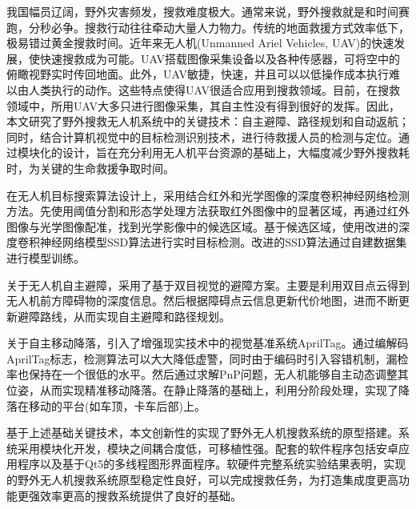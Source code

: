 \CNabstract
{
\thispagestyle{empty}
我国幅员辽阔，野外灾害频发，搜救难度极大。通常来说，野外搜救就是和时间赛跑，分秒必争。搜救行动往往牵动大量人力物力。传统的地面救援方式效率低下，极易错过黄金搜救时间。近年来无人机(Unmanned Ariel Vehicles, UAV)的快速发展，使快速搜救成为可能。UAV搭载图像采集设备以及各种传感器，可将空中的俯瞰视野实时传回地面。此外，UAV敏捷，快速，并且可以以低操作成本执行难以由人类执行的动作。这些特点使得UAV很适合应用到搜救领域。目前，在搜救领域中，所用UAV大多只进行图像采集，其自主性没有得到很好的发挥。因此，本文研究了野外搜救无人机系统中的关键技术：自主避障、路径规划和自动返航；同时，结合计算机视觉中的目标检测识别技术，进行待救援人员的检测与定位。通过模块化的设计，旨在充分利用无人机平台资源的基础上，大幅度减少野外搜救耗时，为关键的生命救援争取时间。

在无人机目标搜索算法设计上，采用结合红外和光学图像的深度卷积神经网络检测方法。先使用阈值分割和形态学处理方法获取红外图像中的显著区域，再通过红外图像与光学图像配准，找到光学影像中的候选区域。基于候选区域，使用改进的深度卷积神经网络模型SSD算法进行实时目标检测。改进的SSD算法通过自建数据集进行模型训练。

关于无人机自主避障，采用了基于双目视觉的避障方案。主要是利用双目点云得到无人机前方障碍物的深度信息。然后根据障碍点云信息更新代价地图，进而不断更新避障路线，从而实现自主避障和路径规划。

关于自主移动降落，引入了增强现实技术中的视觉基准系统AprilTag。通过编解码AprilTag标志，检测算法可以大大降低虚警，同时由于编码时引入容错机制，漏检率也保持在一个很低的水平。然后通过求解PnP问题，无人机能够自主动态调整其位姿，从而实现精准移动降落。在静止降落的基础上，利用分阶段处理，实现了降落在移动的平台(如车顶，卡车后部)上。

基于上述基础关键技术，本文创新性的实现了野外无人机搜救系统的原型搭建。系统采用模块化开发，模块之间耦合度低，可移植性强。配套的软件程序包括安卓应用程序以及基于Qt5的多线程图形界面程序。软硬件完整系统实验结果表明，实现的野外无人机搜救系统原型稳定性良好，可以完成搜救任务，为打造集成度更高功能更强效率更高的搜救系统提供了良好的基础。
\thispagestyle{empty}
}

